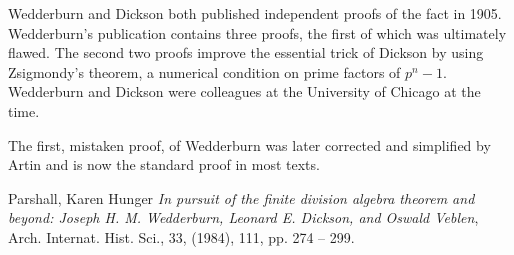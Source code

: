 \documentclass[12pt]{article}
\begin{document}
Wedderburn and Dickson both published independent proofs of the fact in 1905.
Wedderburn's publication contains three proofs, the first of which was ultimately flawed.  The second two proofs improve the essential trick of Dickson by using Zsigmondy's theorem, a numerical condition on prime factors of $p^n-1$.  Wedderburn and Dickson were colleagues at the University of Chicago at the time.

The first, mistaken proof, of Wedderburn was later corrected and simplified by Artin and is now the standard proof in most texts.


\providecommand{\bysame}{\leavevmode\hbox to3em{\hrulefill}\thinspace}
\providecommand{\MR}{\relax\ifhmode\unskip\space\fi MR }
\providecommand{\MRhref}[2]{%
\href{http://www.ams.org/mathscinet-getitem?mr=#1}{#2}
}
\providecommand{\href}[2]{#2}
\begin{thebibliography}{10}

Parshall, Karen Hunger
\emph{In pursuit of the finite division algebra theorem and beyond:
              {J}oseph {H}. {M}. {W}edderburn, {L}eonard {E}. {D}ickson, and
              {O}swald {V}eblen},
Arch. Internat. Hist. Sci., 33, (1984), 111, pp. 274 -- 299.


\end{thebibliography}




\end{document}
